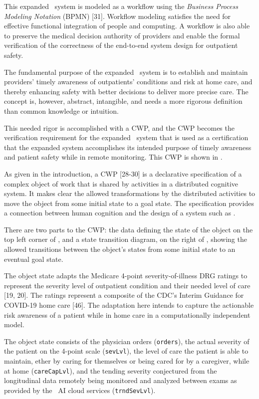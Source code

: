 This expanded \phware\ system is modeled as a workflow using the \emph{Business Process Modeling Notation} (BPMN) [31]. Workflow modeling satisfies the need for effective functional integration of people and computing. A workflow is also able to preserve the medical decision authority of providers and enable the formal verification of the correctness of the end-to-end system design for outpatient safety.

The fundamental purpose of the expanded \phware\ system is to establish and maintain providers' timely awareness of outpatients' conditions and risk at home care, and thereby enhancing safety with better decisions to deliver more precise care. The concept is, however, abstract, intangible, and needs a more rigorous definition than common knowledge or intuition. 

This needed rigor is accomplished with a CWP, and the CWP becomes the verification requirement for the expanded \phware\ system that is used as a certification that the expanded system accomplishes its intended purpose of timely awareness and patient safety while in remote monitoring. This CWP is shown in . 

As given in the introduction, a CWP [28-30] is a declarative specification of a complex object of work that is shared by activities in a distributed cognitive system. It makes clear the allowed transformations by the distributed activities to move the object from some initial state to a goal state. The specification provides a connection between human cognition and the design of a system such as \phware.

There are two parts to the CWP: the data defining the state of the object on the top left corner of , and a state transition diagram, on the right of , showing the allowed transitions between the object's states from some initial state to an eventual goal state. 

The object state adapts the Medicare 4-point severity-of-illness DRG ratings to represent the severity level of outpatient condition and their needed level of care [19, 20]. The ratings represent a composite of the CDC’s Interim Guidance for COVID-19 home care [46]. The adaptation here intends to capture the actionable risk awareness of a patient while in home care in a computationally independent model. 

The object state consists of the physician orders (\texttt{orders}), the actual severity of the patient on the 4-point scale (\texttt{sevLvl}), the level of care the patient is able to maintain, ether by caring for themselves or being cared for by a caregiver, while at home (\texttt{careCapLvl}), and the tending severity conjectured from the longitudinal data remotely being monitored and analyzed between exams as provided by the \phware\ AI cloud services (\texttt{trndSevLvl}).

